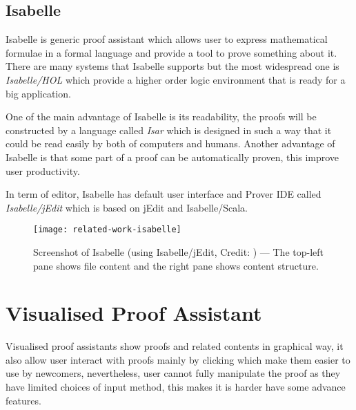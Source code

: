 \documentclass[master.tex]{subfiles}
\begin{document}
\subsection{Isabelle}

Isabelle\supercite{isabelle-official-website} is generic proof assistant which
allows user to express mathematical formulae in a formal language and provide a
tool to prove something about it. There are many systems that Isabelle supports
but the most widespread one is \emph{Isabelle/HOL} which provide a higher order
logic environment that is ready for a big application.

One of the main advantage of Isabelle is its readability, the proofs will be
constructed by a language called \emph{Isar} which is designed in such a way
that it could be read easily by both of computers and humans. Another advantage
of Isabelle is that some part of a proof can be automatically proven, this
improve user productivity.

In term of editor, Isabelle has default user interface and Prover IDE called
\emph{Isabelle/jEdit} which is based on jEdit and Isabelle/Scala.

\begin{figure}[H]
    \centering
    \texttt{[image: related-work-isabelle]}
    \caption{Screenshot of Isabelle (using Isabelle/jEdit, Credit:
      \cite{isabelle-official-website}) --- The top-left pane shows file content
      and the right pane shows content structure.}
\label{fig:related-work-isabelle}
\end{figure}



\section{Visualised Proof Assistant}
Visualised proof assistants show proofs and related contents in graphical way,
it also allow user interact with proofs mainly by clicking which make them
easier to use by newcomers, nevertheless, user cannot fully manipulate the proof
as they have limited choices of input method, this makes it is harder have
some advance features.
\end{document}
